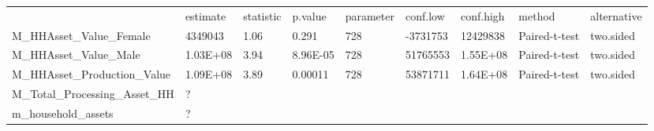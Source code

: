 \documentclass[12pt]{article}
\begin{document}
\begin{table}[]
	\begin{tabular}{lllllllll} \hline
		& estimate & statistic & p.value  & parameter & conf.low & conf.high & method        & alternative \\
		M\_HHAsset\_Value\_Female       & 4349043  & 1.06      & 0.291    & 728       & -3731753 & 12429838  & Paired-t-test & two.sided   \\
		M\_HHAsset\_Value\_Male         & 1.03E+08 & 3.94      & 8.96E-05 & 728       & 51765553 & 1.55E+08  & Paired-t-test & two.sided   \\
		M\_HHAsset\_Production\_Value   & 1.09E+08 & 3.89      & 0.00011  & 728       & 53871711 & 1.64E+08  & Paired-t-test & two.sided   \\
		M\_Total\_Processing\_Asset\_HH & ?        &           &          &           &          &           &               &    \\
		m\_household\_assets & ?        &           &          &           &          &           &               &\\        
	\end{tabular}
\end{table}

	
	
\end{document}
